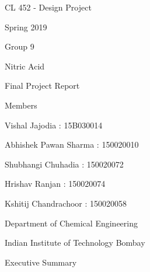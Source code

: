 \documentclass[a4paper,portrait,12pt]{article}
\begin{document}
\begin{flushleft}
CL 452 - Design Project
\end{flushleft}


\begin{flushleft}
Spring 2019
\end{flushleft}


\begin{flushleft}
Group 9
\end{flushleft}





\begin{flushleft}
Nitric Acid
\end{flushleft}


\begin{flushleft}
Final Project Report
\end{flushleft}


\begin{flushleft}
Members
\end{flushleft}


\begin{flushleft}
Vishal Jajodia : 15B030014
\end{flushleft}


\begin{flushleft}
Abhishek Pawan Sharma : 150020010
\end{flushleft}


\begin{flushleft}
Shubhangi Chuhadia : 150020072
\end{flushleft}


\begin{flushleft}
Hrishav Ranjan : 150020074
\end{flushleft}


\begin{flushleft}
Kshitij Chandrachoor : 150020058
\end{flushleft}





\begin{flushleft}
Department of Chemical Engineering
\end{flushleft}


\begin{flushleft}
Indian Institute of Technology Bombay
\end{flushleft}





\begin{flushleft}
\newpage
Executive Summary
\end{flushleft}
\end{document}

